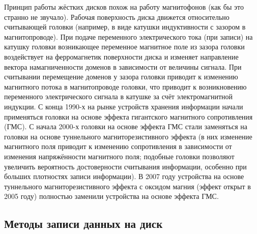 \documentclass[bachelor, och, referat]{SCWorks}
\begin{document}
Принцип работы жёстких дисков похож на работу магнитофонов (как бы это странно не звучало). Рабочая поверхность диска движется относительно считывающей головки (например, в виде катушки индуктивности с зазором в магнитопроводе). При подаче переменного электрического тока (при записи) на катушку головки возникающее переменное магнитное поле из зазора головки воздействует на ферромагнетик поверхности диска и изменяет направление вектора намагниченности доменов в зависимости от величины сигнала. При считывании перемещение доменов у зазора головки приводит к изменению магнитного потока в магнитопроводе головки, что приводит к возникновению переменного электрического сигнала в катушке за счёт электромагнитной индукции. С конца 1990-х на рынке устройств хранения информации начали применяться головки на основе эффекта гигантского магнитного сопротивления (ГМС). С начала 2000-х головки на основе эффекта ГМС стали заменяться на головки на основе туннельного магниторезистивного эффекта (в них изменение магнитного поля приводит к изменению сопротивления в зависимости от изменения напряжённости магнитного поля; подобные головки позволяют увеличить вероятность достоверности считывания информации, особенно при больших плотностях записи информации). В 2007 году устройства на основе туннельного магниторезистивного эффекта с оксидом магния (эффект открыт в 2005 году) полностью заменили устройства на основе эффекта ГМС.

\subsection{Методы записи данных на диск}
\end{document}

